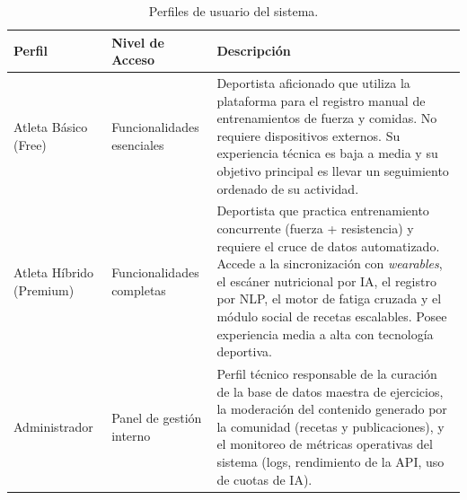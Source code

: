 \documentclass[12pt]{article}
\begin{document}
\begin{table}[h!]
    \centering
    \renewcommand{\arraystretch}{1.3}
    \begin{tabular}{|p{3cm}|p{4cm}|p{7.5cm}|}
        \hline
        \rowcolor[HTML]{EFEFEF}
        \textbf{Perfil} & \textbf{Nivel de Acceso} & \textbf{Descripción} \\ \hline
        Atleta Básico (Free) & Funcionalidades esenciales & Deportista aficionado que utiliza la plataforma para el registro manual de entrenamientos de fuerza y comidas. No requiere dispositivos externos. Su experiencia técnica es baja a media y su objetivo principal es llevar un seguimiento ordenado de su actividad. \\ \hline
        Atleta Híbrido (Premium) & Funcionalidades completas & Deportista que practica entrenamiento concurrente (fuerza + resistencia) y requiere el cruce de datos automatizado. Accede a la sincronización con \textit{wearables}, el escáner nutricional por IA, el registro por NLP, el motor de fatiga cruzada y el módulo social de recetas escalables. Posee experiencia media a alta con tecnología deportiva. \\ \hline
        Administrador & Panel de gestión interno & Perfil técnico responsable de la curación de la base de datos maestra de ejercicios, la moderación del contenido generado por la comunidad (recetas y publicaciones), y el monitoreo de métricas operativas del sistema (logs, rendimiento de la API, uso de cuotas de IA). \\ \hline
    \end{tabular}
    \caption{Perfiles de usuario del sistema.}
    \label{tab:perfiles_usuario}
\end{table}
\newpage
\end{document}
